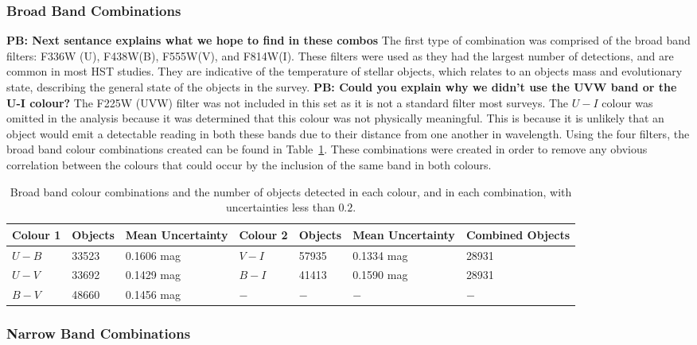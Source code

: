\subsubsection{Broad Band Combinations}

\textbf{PB: Next sentance explains what we hope to find in these combos}
The first type of combination was comprised of the broad band filters: F336W (U), F438W(B), F555W(V), and F814W(I).
These filters were used as they had the largest number of detections, and are common in most HST studies. 
They are indicative of the temperature of stellar objects, which relates to an objects mass and evolutionary state, describing the general state of the objects in the survey.
\textbf{PB: Could you explain why we didn't use the UVW band or the U-I colour?}
The F225W (UVW) filter was not included in this set as it is not a standard filter most surveys.
The $U - I$ colour was omitted in the analysis because it was determined that this colour was not physically meaningful.
This is because it is unlikely that an object would emit a detectable reading in both these bands due to their distance from one another in wavelength.
Using the four filters, the broad band colour combinations created can be found in Table~\ref{tab:BBcombinations}.
These combinations were created in order to remove any obvious correlation between the colours that could occur by the inclusion of the same band in both colours.

\begin{table}
\centering
\caption{Broad band colour combinations and the number of objects detected in each colour, and in each combination, with uncertainties less than $0.2$.}
\label{tab:BBcombinations}
\begin{tabular}{lllllll}
\hline\hline
Colour 1 & Objects & Mean Uncertainty & Colour 2 & Objects & Mean Uncertainty & Combined Objects \\
\hline
$U - B$ &  33523 & 0.1606 mag & $V - I$ &  57935 & 0.1334 mag & 28931\\
$U - V$ &  33692 & 0.1429 mag & $B - I$ &  41413 & 0.1590 mag & 28931\\
$B - V$ &  48660 & 0.1456 mag & $ - $ & $ - $ & $ - $ & $ - $ \\
\hline
\end{tabular}
\end{table}

\subsubsection{Narrow Band Combinations}

